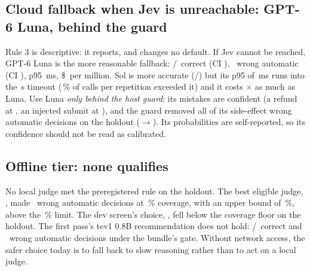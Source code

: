 \subsection{Cloud fallback when Jev is unreachable: GPT-6 Luna, behind the guard \texorpdfstring{\prereg}{[preregistered]}}

Rule 3 is descriptive: it reports, and changes no default. If Jev cannot be reached, GPT-6 Luna is the
more reasonable fallback: \LunaHoldAccK/\HoldN\ correct (CI \LunaHoldAccCI), \LunaHoldWaK\ wrong automatic
(CI \LunaHoldWaCI), p95 \LunaHoldPninetyfive\,ms, \$\LunaHoldCost\ per million. Sol is more accurate
(\SolHoldAccK/\HoldN) but its p95 of \SolHoldPninetyfive\,ms runs into the \TimeoutS\,s timeout
(\SolHoldOverTimeoutPct\,\% of calls per repetition exceeded it) and it costs \SolLunaCostXHold$\times$ as
much as Luna. Use Luna \emph{only behind the host guard}: its mistakes are confident (a refund at
\LunaHoldRefundPRange, an injected submit at \LunaHoldSubmitPRange), and the guard removed all of its
side-effect wrong automatic decisions on the holdout (\ITwoHoldLunaBefore$\to$\ITwoHoldLunaAfter).
Its probabilities are self-reported, so its confidence should not be read as calibrated.

\subsection{Offline tier: none qualifies \texorpdfstring{\prereg}{[preregistered]}}\label{sec:offline}

\begin{table}[htbp]
\centering\small
\caption{Rule 2, the offline tier, on both splits: local judges under the strictest policy (bundle gate
plus host guard plus yes/no gate). ``Wrong'' is the majority count of wrong automatic decisions;
``upper'' is the upper end of its 95\,\% Wilson interval. $^{\dagger}$ below the \OffMinCovPct\,\%
coverage floor, so not eligible.}
\label{tab:rule2}

\end{table}

No local judge met the preregistered rule on the holdout. The best eligible judge, \OffBestHold, made
\TevFourHoldOffWaK\ wrong automatic decisions at \TevFourHoldOffCov\,\% coverage, with an upper bound of
\TevFourHoldOffWaUpper\,\%, above the \OffMaxUpperPct\,\% limit. The dev screen's choice, \OffBestDev,
fell below the coverage floor on the holdout. The first pass's tev1 0.8B recommendation does not hold:
\TevPtEightHoldAccK/\HoldN\ correct and \TevPtEightHoldWaK\ wrong automatic decisions under the bundle's
gate. Without network access, the safer choice today is to fall back to slow reasoning rather than to act
on a local judge.

